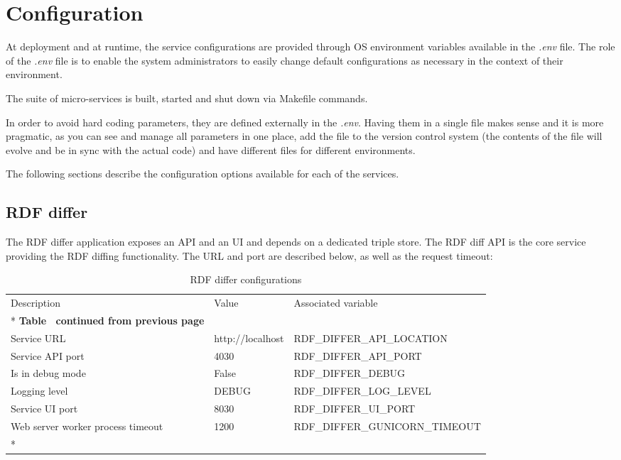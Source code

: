 \section{Configuration}
\label{sec:configuration}
At deployment and at runtime, the service configurations are provided through OS environment variables available in the \textit{.env} file. The role of the \textit{.env} file is to enable the system administrators to easily change default configurations as necessary in the context of their environment.

The suite of micro-services is built, started and shut down via Makefile commands.

In order to avoid hard coding parameters, they are defined externally in the \textit{.env}. Having them in a single file makes  sense and it is more pragmatic, as you can see and manage all parameters in one place, add the file to the version control system (the contents of the file will evolve and be in sync with the actual code) and have different files for different environments.

The following sections describe the configuration options available for each of the services.

\subsection{RDF differ}

The RDF differ application exposes an API and an UI and depends on a dedicated triple store. The RDF diff API is the core service providing the RDF diffing functionality. The URL and port are described below, as well as the request timeout:

\begin{longtable}[c]{@{}p{3.5cm}p{3.5cm}l@{}}
	\toprule
	Description                       & Value            & Associated variable            \\* \midrule
	\endfirsthead
	\multicolumn{3}{c}%
	{{\bfseries Table \thetable\ continued from previous page}}                           \\
	\endhead
	\bottomrule
	\endfoot
	\endlastfoot
	Service URL                       & http://localhost & RDF\_DIFFER\_API\_LOCATION     \\
	Service API port                  & 4030             & RDF\_DIFFER\_API\_PORT         \\
	Is in debug mode                  & False            & RDF\_DIFFER\_DEBUG             \\
	Logging level                     & DEBUG            & RDF\_DIFFER\_LOG\_LEVEL        \\
	Service UI port                   & 8030             & RDF\_DIFFER\_UI\_PORT          \\
	Web server worker process timeout & 1200             & RDF\_DIFFER\_GUNICORN\_TIMEOUT \\* \bottomrule
	\caption{RDF differ configurations}
	\label{tab:my-table1}                                                                 \\
\end{longtable}

